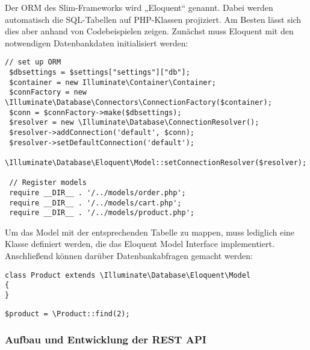 Der \ac{ORM} des Slim-Frameworks wird „Eloquent“ genannt. Dabei werden automatisch die SQL-Tabellen auf PHP-Klassen projiziert. Am Besten lässt sich dies aber anhand von Codebeispielen zeigen.
Zunächst muss Eloquent mit den notwendigen Datenbankdaten initialisiert werden:
\lstset{language=PHP}  
\begin{lstlisting}[frame=single, breaklines=true] 
// set up ORM
 $dbsettings = $settings["settings"]["db"];
 $container = new Illuminate\Container\Container;
 $connFactory = new \Illuminate\Database\Connectors\ConnectionFactory($container);
 $conn = $connFactory->make($dbsettings);
 $resolver = new \Illuminate\Database\ConnectionResolver();
 $resolver->addConnection('default', $conn);
 $resolver->setDefaultConnection('default');
 \Illuminate\Database\Eloquent\Model::setConnectionResolver($resolver);
 
 // Register models
 require __DIR__ . '/../models/order.php';
 require __DIR__ . '/../models/cart.php';
 require __DIR__ . '/../models/product.php';
\end{lstlisting}

Um das Model mit der entsprechenden Tabelle zu mappen, muss lediglich eine Klasse definiert werden, die das Eloquent Model Interface implementiert. Anschließend können darüber Datenbankabfragen gemacht werden:
\begin{lstlisting}[frame=single] 
class Product extends \Illuminate\Database\Eloquent\Model
{
}
\end{lstlisting}
\begin{lstlisting}[frame=single] 
 $product = \Product::find(2);
\end{lstlisting}

\subsubsection{Aufbau und Entwicklung der REST API}  
\label{sec:Aufbau und Entwicklung der REST API-1}
